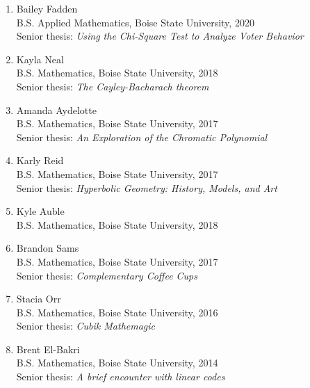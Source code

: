 \documentclass[12pt]{article}
\begin{document}
\begin{enumerate}[revarabic,labelwidth=*]
\item Bailey Fadden \\
B.S. Applied Mathematics, Boise State University, 2020 \\
Senior thesis: \emph{Using the Chi-Square Test to Analyze Voter Behavior}


\item Kayla Neal \\
B.S. Mathematics, Boise State University, 2018 \\
Senior thesis: \emph{The Cayley-Bacharach theorem}

\item Amanda Aydelotte \\
B.S. Mathematics, Boise State University, 2017 \\
Senior thesis: \emph{An Exploration of the Chromatic Polynomial} %

\item Karly Reid \\
B.S. Mathematics, Boise State University, 2017 \\
Senior thesis: \emph{Hyperbolic Geometry: History, Models, and Art}

\item Kyle Auble \\
B.S. Mathematics, Boise State University, 2018

\item Brandon Sams \\
B.S. Mathematics, Boise State University, 2017 \\
Senior thesis: \emph{Complementary Coffee Cups} %

\item Stacia Orr \\
B.S. Mathematics, Boise State University, 2016 \\
Senior thesis: \emph{Cubik Mathemagic}

\item Brent El-Bakri \\
B.S. Mathematics, Boise State University, 2014 \\
Senior thesis: \emph{A brief encounter with linear codes} %
\end{enumerate}
\end{document}
